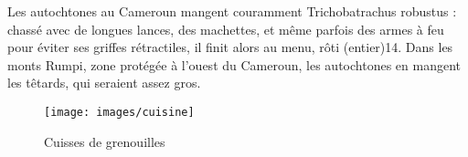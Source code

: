 \documentclass[10pt,a4paper]{article}
\begin{document}
Les autochtones au Cameroun mangent couramment Trichobatrachus robustus : chassé avec de longues lances, des machettes, et même parfois des armes à feu pour éviter ses griffes rétractiles, il finit alors au menu, rôti (entier)14. Dans les monts Rumpi, zone protégée à l'ouest du Cameroun, les autochtones en mangent les têtards, qui seraient assez gros.

\begin{figure}
\begin{center}
\texttt{[image: images/cuisine]}
\end{center}
\caption{Cuisses de grenouilles}
\label{fig:gre}
\end{figure}
				
\end{document}
